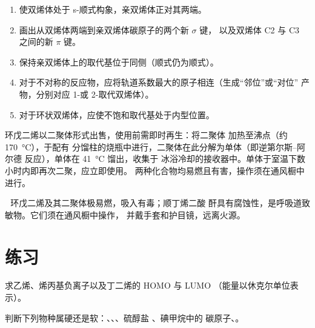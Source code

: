 \begin{method}\label{met:b2:frontier-orbitals:diels-alder}
\begin{enumerate}
  \item 使双烯体处于 s-顺式构象，亲双烯体正对其两端。
  \item 画出从双烯体两端到亲双烯体碳原子的两个新 $\sigma$ 键，
        以及双烯体 C2 与 C3 之间的新 $\pi$ 键。
  \item 保持亲双烯体上的取代基位于同侧（顺式仍为顺式）。
  \item 对于不对称的反应物，应将轨道系数最大的原子相连（生成“邻位”或“对位”
        产物，分别对应 1-或 2-取代双烯体）。
  \item 对于环状双烯体，应使不饱和取代基处于内型位置。
\end{enumerate}
\end{method}

\begin{inthelab}[裂解二环戊二烯]
环戊二烯以二聚体形式出售，使用前需即时再生：将二聚体
加热至沸点（约 \qty{170}{\degreeCelsius}），于配有
分馏柱的烧瓶中进行，二聚体在此分解为单体（即逆第尔斯–阿尔德
反应），单体在 \qty{41}{\degreeCelsius} 馏出，收集于
冰浴冷却的接收器中。单体于室温下数小时内即再次二聚，应立即使用。
两种化合物均易燃且有害，操作须在通风橱中进行。
\end{inthelab}

\begin{safety}{\,\,}
环戊二烯及其二聚体极易燃，吸入有毒；顺丁烯二酸
酐具有腐蚀性，是呼吸道致敏物。它们须在通风橱中操作，
并戴手套和护目镜，远离火源。
\end{safety}

\section{练习}

\begin{exercise}[$\star$]\label{exo:b2:frontier-orbitals:1}
求乙烯、烯丙基负离子以及丁二烯的 HOMO 与 LUMO
（能量以休克尔单位表示）。
\end{exercise}

\begin{exercise}[$\star$]\label{exo:b2:frontier-orbitals:2}
判断下列物种属硬还是软：、、、硫醇盐 、碘甲烷中的
碳原子、。
\end{exercise}

